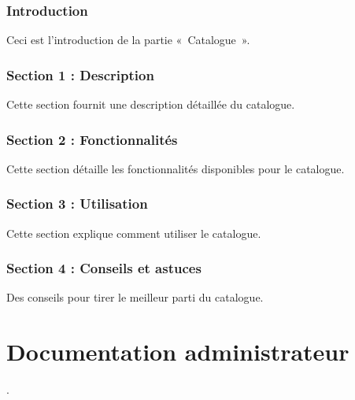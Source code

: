 \documentclass[letterpaper,10pt,french]{sphinxmanual}
\begin{document}
\subsection{Introduction}
\label{\detokenize{doc_user/import:introduction}}
\sphinxAtStartPar
Ceci est l’introduction de la partie « Catalogue ».


\subsection{Section 1 : Description}
\label{\detokenize{doc_user/import:section-1-description}}
\sphinxAtStartPar
Cette section fournit une description détaillée du catalogue.


\subsection{Section 2 : Fonctionnalités}
\label{\detokenize{doc_user/import:section-2-fonctionnalites}}
\sphinxAtStartPar
Cette section détaille les fonctionnalités disponibles pour le catalogue.


\subsection{Section 3 : Utilisation}
\label{\detokenize{doc_user/import:section-3-utilisation}}
\sphinxAtStartPar
Cette section explique comment utiliser le catalogue.


\subsection{Section 4 : Conseils et astuces}
\label{\detokenize{doc_user/import:section-4-conseils-et-astuces}}
\sphinxAtStartPar
Des conseils pour tirer le meilleur parti du catalogue.

\sphinxstepscope


\chapter{Documentation administrateur}
\label{\detokenize{doc_admin:documentation-administrateur}}\label{\detokenize{doc_admin::doc}}
\sphinxAtStartPar
{}.

\sphinxstepscope
\end{document}
